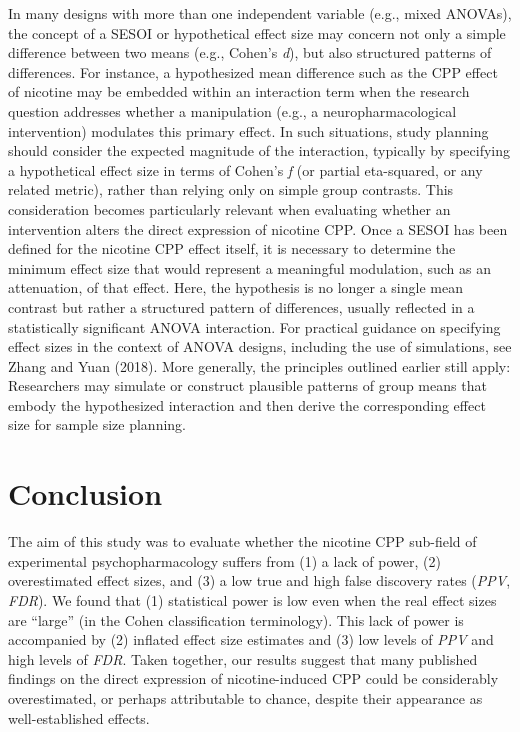 \documentclass[authordate, meta, issue]{jote-new-article}
\begin{document}
	In many designs with more than one independent variable (e.g., mixed ANOVAs), the concept of a SESOI or hypothetical effect size may concern not only a simple difference between two means (e.g., Cohen's \emph{d}), but also structured patterns of differences. For instance, a hypothesized mean difference such as the CPP effect of nicotine may be embedded within an interaction term when the research question addresses whether a manipulation (e.g., a neuropharmacological intervention) modulates this primary effect. In such situations, study planning should consider the expected magnitude of the interaction, typically by specifying a hypothetical effect size in terms of Cohen's \emph{f }(or partial eta-squared, or any related metric), rather than relying only on simple group contrasts. This consideration becomes particularly relevant when evaluating whether an intervention alters the direct expression of nicotine CPP. Once a SESOI has been defined for the nicotine CPP effect itself, it is necessary to determine the minimum effect size that would represent a meaningful modulation, such as an attenuation, of that effect. Here, the hypothesis is no longer a single mean contrast but rather a structured pattern of differences, usually reflected in a statistically significant ANOVA interaction. For practical guidance on specifying effect sizes in the context of ANOVA designs, including the use of simulations, see Zhang and Yuan (2018). More generally, the principles outlined earlier still apply: Researchers may simulate or construct plausible patterns of group means that embody the hypothesized interaction and then derive the corresponding effect size for sample size planning.



	\section{\textbf{Conclusion}}



	The aim of this study was to evaluate whether the nicotine CPP sub-field of experimental psychopharmacology suffers from (1) a lack of power, (2) overestimated effect sizes, and (3) a low true and high false discovery rates (\emph{PPV}, \emph{FDR}). We found that (1) statistical power is low even when the real effect sizes are “large” (in the Cohen classification terminology). This lack of power is accompanied by (2) inflated effect size estimates and (3) low levels of \emph{PPV} and high levels of \emph{FDR}. Taken together, our results suggest that many published findings on the direct expression of nicotine-induced CPP could be considerably overestimated, or perhaps attributable to chance, despite their appearance as well-established effects.
\end{document}

